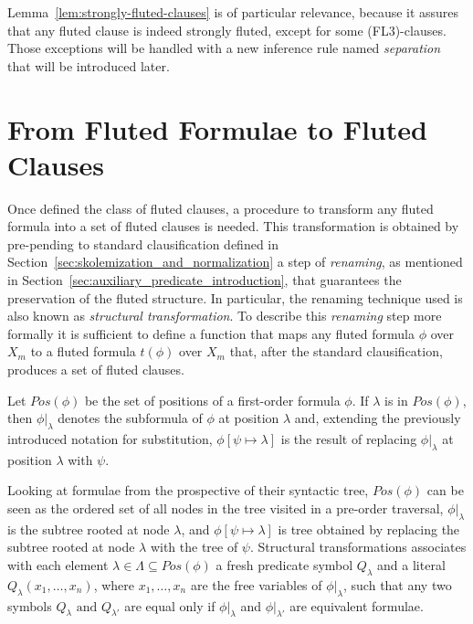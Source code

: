Lemma~\ref{lem:strongly-fluted-clauses} is of particular relevance, because it assures that any fluted clause is indeed strongly fluted, except for some (FL3)-clauses. Those exceptions will be handled with a new inference rule named \emph{separation} that will be introduced later.

\section{From Fluted Formulae to Fluted Clauses}\label{sec:from-fluted-formulae-to-fluted-clauses}

Once defined the class of fluted clauses, a procedure to transform any fluted formula into a set of fluted clauses is needed.
This transformation is obtained by pre-pending to standard clausification defined in Section~\ref{sec:skolemization_and_normalization} a step of \emph{renaming}, as mentioned in Section~\ref{sec:auxiliary_predicate_introduction}, that guarantees the preservation of the fluted structure.
In particular, the renaming technique used is also known as \emph{structural transformation}.
To describe this \emph{renaming} step more formally it is sufficient to define a function that maps any fluted formula \(\phi\) over \(X_m\) to a fluted formula \(t(\phi)\) over \(X_m\) that, after the standard clausification, produces a set of fluted clauses.

Let \(Pos(\phi)\) be the set of positions of a first-order formula \(\phi\). If \(\lambda\) is in \(Pos(\phi)\), then \(\phi|_\lambda\) denotes the subformula of \(\phi\) at position \(\lambda\) and, extending the previously introduced notation for substitution, \(\phi[\psi\mapsto\lambda]\) is the result of replacing \(\phi|_\lambda\)  at position \(\lambda\) with \(\psi\).

Looking at formulae from the prospective of their syntactic tree, \(Pos(\phi)\) can be seen as the ordered set of all nodes in the tree visited in a pre-order traversal, \(\phi|_\lambda\) is the subtree rooted at node \(\lambda\), and \(\phi[\psi\mapsto\lambda]\) is tree obtained by replacing the subtree rooted at node \(\lambda\) with the tree of \(\psi\).
Structural transformations associates with each element \(\lambda \in \Lambda \subseteq Pos(\phi)\) a fresh predicate symbol \(Q_\lambda\) and a literal \(Q_\lambda(x_1,\ldots,x_n)\), where \(x_1,\ldots,x_n\) are the free variables of \(\phi|_\lambda\), such that any two symbols \(Q_\lambda \text{ and } Q_{\lambda'}\) are equal only if \(\phi|_\lambda\) and \(\phi|_{\lambda'}\) are equivalent formulae.

